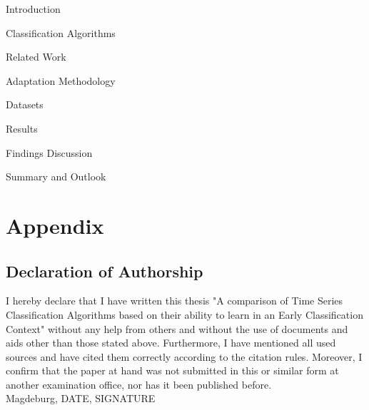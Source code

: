 \renewcommand*\contentsname{Table of Contents}
\tableofcontents
\thispagestyle{empty}
 
 \null\newpage
{} 






\thispagestyle{empty}
\null\newpage
{}
{Introduction}
\null\newpage

{Classification Algorithms}
\null\newpage

{Related Work}
\null\newpage

{Adaptation Methodology}
\null\newpage

{Datasets}
\null\newpage

{Results}
\null\newpage

{Findings Discussion}
\null\newpage

{Summary and Outlook}

\chapter*{Appendix}

\null\newpage

% 
\printbibliography
\newpage

\section{Declaration of Authorship}
I hereby declare that I have written this thesis "A comparison of Time Series Classification Algorithms based on their ability to learn in an Early Classification Context"
without any help from others and without the use of documents and aids
other than those stated above. Furthermore, I have mentioned all used
sources and have cited them correctly according to the citation rules.
Moreover, I confirm that the paper at hand was not submitted in this or
similar form at another examination office, nor has it been published
before.
\\
Magdeburg, DATE, SIGNATURE